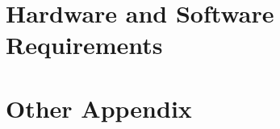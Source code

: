 \chapter{Hardware and Software Requirements}
\label{app:requirements}


\chapter{Other Appendix}
\label{app:other}

